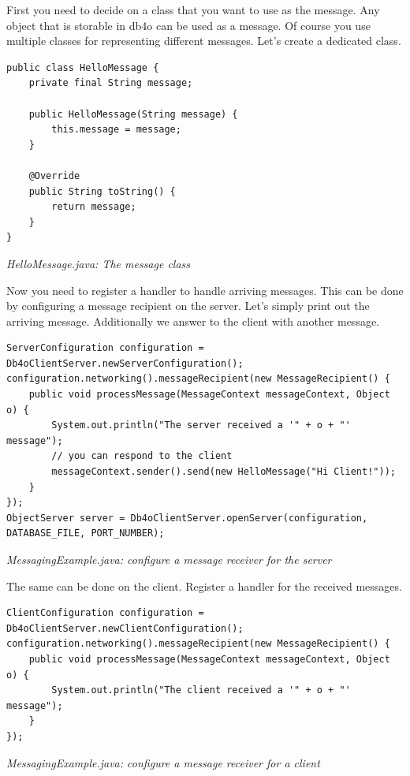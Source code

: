 First you need to decide on a class that you want to use as the message. Any object that is storable in db4o can be used as a message. Of course you use multiple classes for representing different messages. Let's create a dedicated class.

\begin{lstlisting}
public class HelloMessage {
    private final String message;

    public HelloMessage(String message) {
        this.message = message;
    }

    @Override
    public String toString() {
        return message;
    }
}
\end{lstlisting}

{\small\itshape HelloMessage.java: The message class\par}
\medskip

Now you need to register a handler to handle arriving messages. This can be done by configuring a message recipient on the server. Let's simply print out the arriving message. Additionally we answer to the client with another message.

\begin{lstlisting}
ServerConfiguration configuration = Db4oClientServer.newServerConfiguration();
configuration.networking().messageRecipient(new MessageRecipient() {
    public void processMessage(MessageContext messageContext, Object o) {
        System.out.println("The server received a '" + o + "' message");
        // you can respond to the client
        messageContext.sender().send(new HelloMessage("Hi Client!"));
    }
});
ObjectServer server = Db4oClientServer.openServer(configuration, DATABASE_FILE, PORT_NUMBER);
\end{lstlisting}

{\small\itshape MessagingExample.java: configure a message receiver for the server\par}
\medskip

The same can be done on the client. Register a handler for the received messages.

\begin{lstlisting}
ClientConfiguration configuration = Db4oClientServer.newClientConfiguration();
configuration.networking().messageRecipient(new MessageRecipient() {
    public void processMessage(MessageContext messageContext, Object o) {
        System.out.println("The client received a '" + o + "' message");
    }
});
\end{lstlisting}

{\small\itshape MessagingExample.java: configure a message receiver for a client\par}
\medskip

